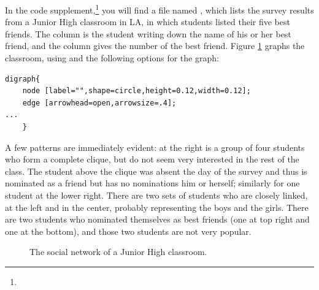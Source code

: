 In the code supplement,\footnote{\samplecodelocation} you will find 
a file named , which lists the survey results from a
Junior High classroom in LA, in which students listed their five best friends.
The  column is the student writing down the name of his or her
best friend, and the  column gives the number of the best
friend. Figure \ref{classnet} graphs the classroom, using  and
the following options for the graph:
\label{graphhead}\begin{lstlisting}
digraph{
    node [label="",shape=circle,height=0.12,width=0.12];
    edge [arrowhead=open,arrowsize=.4];
...
    }
\end{lstlisting}

A few patterns are immediately evident: at the right is a group of four students
who form a complete clique, but do not seem very interested in the rest
of the class. The student above the clique was absent the
day of the survey and thus is nominated as a friend but has no
nominations him or herself; similarly for one student at the lower right. There
are two sets of students who are closely linked, at the left and in
the center, probably representing the boys and the girls. There are two
students who nominated themselves as best friends (one at top right and
one at the bottom), and those two students are not very popular.

\begin{figure}
\begin{center}
\caption{The social network of a Junior High classroom.} \label{classnet}
\end{center}
\end{figure}



